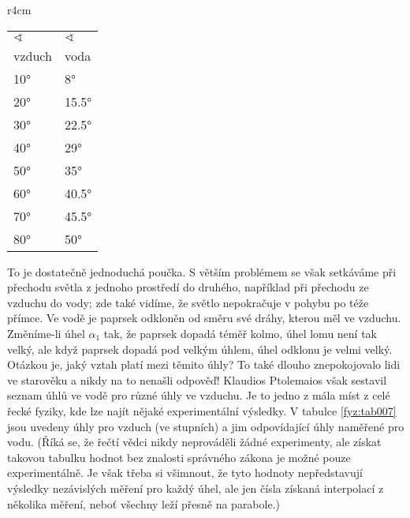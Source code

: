     \begin{wraptable}[21]{r}{4cm}      %
      \centering
      \renewcommand{\arraystretch}{1.4}
      \begin{tabular}{>{\centering\arraybackslash}p{3em}|>{\centering\arraybackslash}p{3em}}
         \hline \(\sphericalangle\) & \(\sphericalangle\)     \\
                    vzduch & voda         \\
         \hline   \ang{10} & \ang{8}      \\
                  \ang{20} & \ang{15.5}   \\
                  \ang{30} & \ang{22.5}   \\
                  \ang{40} & \ang{29}     \\
                  \ang{50} & \ang{35}     \\
                  \ang{60} & \ang{40.5}   \\
                  \ang{70} & \ang{45.5}   \\
                  \ang{80} & \ang{50}     \\
         \hline 
      \end{tabular}
      \caption{Ptolemaiovy hodnoty pro lom světla vzduch - voda 
               (\cite[s.~347]{Feynman01})}
      \label{fyz:tab007}
    \end{wraptable}
    To je dostatečně jednoduchá poučka. S větším problémem se však setkáváme při přechodu světla z 
    jednoho prostředí do druhého, například při přechodu ze vzduchu do vody; zde také vidíme, že 
    světlo nepokračuje v pohybu po téže přímce. Ve vodě je paprsek odkloněn od směru své dráhy, 
    kterou měl ve vzduchu. Změníme-li úhel \(\alpha_1\) tak, že paprsek dopadá téměř kolmo, úhel 
    lomu není tak velký, ale když paprsek dopadá pod velkým úhlem, úhel odklonu je velmi velký. 
    Otázkou je, jaký vztah platí mezi těmito úhly? To také dlouho znepokojovalo lidi ve starověku a 
    nikdy na to nenašli odpověď! Klaudios Ptolemaios však sestavil seznam úhlů ve vodě pro různé 
    úhly ve vzduchu. Je to jedno z mála míst z celé řecké fyziky, kde lze najít nějaké 
    experimentální výsledky. V tabulce \ref{fyz:tab007} jsou uvedeny úhly pro vzduch (ve stupních) 
    a jim odpovídající úhly naměřené pro vodu. (Říká se, že řečtí vědci nikdy neprováděli žádné 
    experimenty, ale získat takovou tabulku hodnot bez znalosti správného zákona je možné pouze 
    experimentálně. Je však třeba si všimnout, že tyto hodnoty nepředstavují výsledky nezávislých 
    měření pro každý úhel, ale jen čísla získaná interpolací z několika měření, neboť všechny leží 
    přesně na parabole.)

